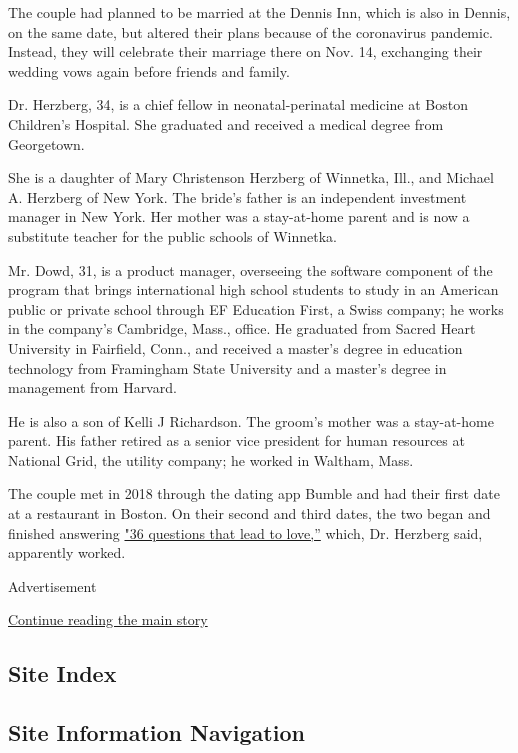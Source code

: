 The couple had planned to be married at the Dennis Inn, which is also in
Dennis, on the same date, but altered their plans because of the
coronavirus pandemic. Instead, they will celebrate their marriage there
on Nov. 14, exchanging their wedding vows again before friends and
family.

Dr. Herzberg, 34, is a chief fellow in neonatal-perinatal medicine at
Boston Children's Hospital. She graduated and received a medical degree
from Georgetown.

She is a daughter of Mary Christenson Herzberg of Winnetka, Ill., and
Michael A. Herzberg of New York. The bride's father is an independent
investment manager in New York. Her mother was a stay-at-home parent and
is now a substitute teacher for the public schools of Winnetka.

Mr. Dowd, 31, is a product manager, overseeing the software component of
the program that brings international high school students to study in
an American public or private school through EF Education First, a Swiss
company; he works in the company's Cambridge, Mass., office. He
graduated from Sacred Heart University in Fairfield, Conn., and received
a master's degree in education technology from Framingham State
University and a master's degree in management from Harvard.

He is also a son of Kelli J Richardson. The groom's mother was a
stay-at-home parent. His father retired as a senior vice president for
human resources at National Grid, the utility company; he worked in
Waltham, Mass.

The couple met in 2018 through the dating app Bumble and had their first
date at a restaurant in Boston. On their second and third dates, the two
began and finished answering
\href{https://www.nytimes.com/2015/01/11/style/36-questions-that-lead-to-love.html}{"36
questions that lead to love,''} which, Dr. Herzberg said, apparently
worked.

Advertisement

\protect\hyperlink{after-bottom}{Continue reading the main story}

\hypertarget{site-index}{%
\subsection{Site Index}\label{site-index}}

\hypertarget{site-information-navigation}{%
\subsection{Site Information
Navigation}\label{site-information-navigation}}

